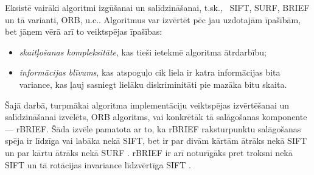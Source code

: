 Eksistē vairāki algoritmi  izgūšanai un
salīdzināšanai, t.sk.,~%
SIFT, %
SURF, BRIEF un tā varianti, ORB, u.c..
Algoritmus var izvērtēt pēc jau uzdotajām īpašībām, 
bet jāņem vērā arī to veiktspējas īpašības:
\begin{itemize}
	\item \emph{skaitļošanas kompleksitāte}, kas tieši ietekmē algoritma
		ātrdarbību;
	\item \emph{informācijas blīvums}, kas atspoguļo cik liela ir katra
		informācijas bita variance, kas ļauj sasniegt lielāku diskriminitāti
		pie mazāka bitu skaita.
\end{itemize}

Šajā darbā, turpmākai algoritma implementāciju veiktspējas izvērtēšanai
un salīdzināšanai izvēlēts, ORB algoritms, vai konkrētāk tā salāgošanas
komponente --- rBRIEF.
Šāda izvēle pamatota ar to, ka rBRIEF raksturpunktu salāgošanas
spēja ir līdzīga vai labāka nekā SIFT, bet ir par divām kārtām ātrāks nekā
SIFT un par kārtu ātrāks nekā SURF \cite{ORB}.
rBRIEF  ir arī noturīgāks pret troksni nekā
SIFT un tā rotācijas invariance līdzvērtīga SIFT \cite{ORB}.


